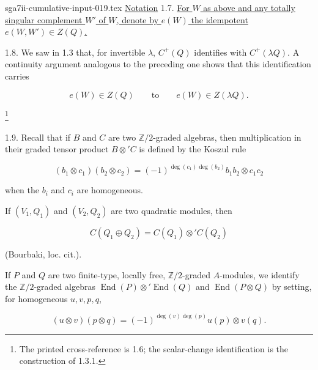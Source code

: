 \begin{filecontents*}{sga7ii-cumulative-input-019.tex}
\underline{Notation} 1.7. \underline{For $W$ as above and any totally
singular complement $W'$ of $W$, denote by $e(W)$ the idempotent
$e(W,W')\in Z(Q)$.}

1.8. We saw in 1.3 that, for invertible $\lambda$, $C^+(Q)$ identifies
with $C^+(\lambda Q)$.  A continuity argument analogous to the preceding
one shows that this identification carries

\begin{equation*}
e(W)\in Z(Q)\qquad\text{to}\qquad e(W)\in Z(\lambda Q).
\end{equation*}

\footnote{The printed cross-reference is 1.6; the scalar-change
identification is the construction of 1.3.1.}


1.9. Recall that if $B$ and $C$ are two $\mathbb Z/2$-graded algebras,
then multiplication in their graded tensor product $B\otimes' C$ is
defined by the Koszul rule

\begin{equation*}
(b_1\otimes c_1)(b_2\otimes c_2)
=(-1)^{\deg(c_1)\deg(b_2)}b_1b_2\otimes c_1c_2
\end{equation*}

when the $b_i$ and $c_i$ are homogeneous.

If $(V_1,Q_1)$ and $(V_2,Q_2)$ are two quadratic modules, then

\begin{equation*}
C(Q_1\oplus Q_2)=C(Q_1)\otimes' C(Q_2)
\end{equation*}

(Bourbaki, loc. cit.).

If $P$ and $Q$ are two finite-type, locally free, $\mathbb Z/2$-graded
$A$-modules, we identify the $\mathbb Z/2$-graded algebras
$\operatorname{End}(P)\otimes'\operatorname{End}(Q)$ and
$\operatorname{End}(P\otimes Q)$ by setting, for homogeneous
$u,v,p,q$,

\begin{equation*}
(u\otimes v)(p\otimes q)
=(-1)^{\deg(v)\deg(p)}u(p)\otimes v(q).
\end{equation*}
\end{filecontents*}
